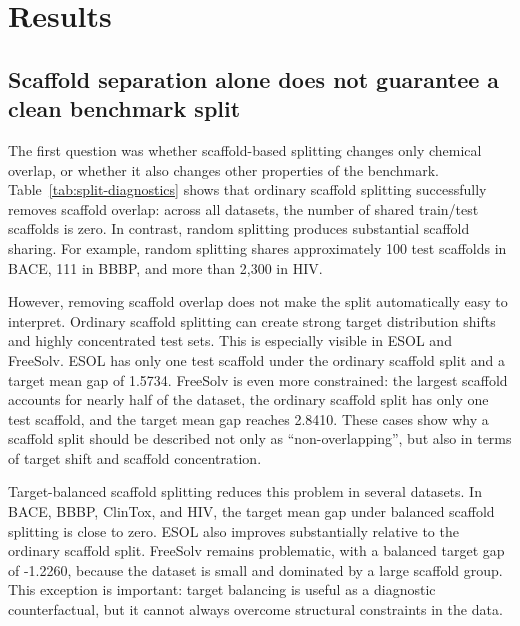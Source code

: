 \section{Results}

\subsection{Scaffold separation alone does not guarantee a clean benchmark split}

The first question was whether scaffold-based splitting changes only chemical overlap, or whether it also changes other properties of the benchmark. Table~\ref{tab:split-diagnostics} shows that ordinary scaffold splitting successfully removes scaffold overlap: across all datasets, the number of shared train/test scaffolds is zero. In contrast, random splitting produces substantial scaffold sharing. For example, random splitting shares approximately 100 test scaffolds in BACE, 111 in BBBP, and more than 2,300 in HIV.

However, removing scaffold overlap does not make the split automatically easy to interpret. Ordinary scaffold splitting can create strong target distribution shifts and highly concentrated test sets. This is especially visible in ESOL and FreeSolv. ESOL has only one test scaffold under the ordinary scaffold split and a target mean gap of 1.5734. FreeSolv is even more constrained: the largest scaffold accounts for nearly half of the dataset, the ordinary scaffold split has only one test scaffold, and the target mean gap reaches 2.8410. These cases show why a scaffold split should be described not only as ``non-overlapping'', but also in terms of target shift and scaffold concentration.

Target-balanced scaffold splitting reduces this problem in several datasets. In BACE, BBBP, ClinTox, and HIV, the target mean gap under balanced scaffold splitting is close to zero. ESOL also improves substantially relative to the ordinary scaffold split. FreeSolv remains problematic, with a balanced target gap of -1.2260, because the dataset is small and dominated by a large scaffold group. This exception is important: target balancing is useful as a diagnostic counterfactual, but it cannot always overcome structural constraints in the data.

